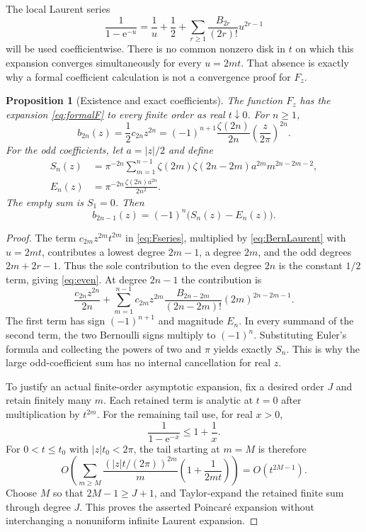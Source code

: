 \documentclass[11pt,a4paper]{article}
\numberwithin{equation}{section}
\newtheorem{proposition}[theorem]{Proposition}
\theoremstyle{definition}
\theoremstyle{remark}
\newcommand{\e}{\mathrm e}
\begin{document}
The local Laurent series
\begin{equation}
 \frac1{1-\e^{-u}}=\frac1u+\frac12+
       \sum_{r\ge1}\frac{B_{2r}}{(2r)!}u^{2r-1}
 \label{eq:BernLaurent}
\end{equation}
will be used coefficientwise. There is no common nonzero disk in $t$ on which this expansion converges simultaneously for every $u=2mt$. That absence is exactly why a formal coefficient calculation is not a convergence proof for $F_z$.

\begin{proposition}[Existence and exact coefficients]
\label{prop:coeff}
The function $F_z$ has the expansion \eqref{eq:formalF} to every finite order as real $t\downarrow0$. For $n\ge1$,
\begin{equation}
 b_{2n}(z)=\frac12c_{2n}z^{2n}
 =(-1)^{n+1}\frac{\zeta(2n)}{2n}
                 \left(\frac{z}{2\pi}\right)^{2n}.
 \label{eq:even}
\end{equation}
For the odd coefficients, let $a=|z|/2$ and define
\begin{align}
 S_n(z)&=\pi^{-2n}\sum_{m=1}^{n-1}
  \zeta(2m)\zeta(2n-2m)a^{2m}m^{2n-2m-2},\label{eq:S}\\
 E_n(z)&=\pi^{-2n}\frac{\zeta(2n)a^{2n}}{2n^2}.
 \label{eq:E}
\end{align}
The empty sum is $S_1=0$. Then
\begin{equation}
 b_{2n-1}(z)=(-1)^n\bigl(S_n(z)-E_n(z)\bigr).
 \label{eq:odd}
\end{equation}
\end{proposition}
\begin{proof}
The term $c_{2m}z^{2m}t^{2m}$ in \eqref{eq:Fseries}, multiplied by \eqref{eq:BernLaurent} with $u=2mt$, contributes a lowest degree $2m-1$, a degree $2m$, and the odd degrees $2m+2r-1$. Thus the sole contribution to the even degree $2n$ is the constant $1/2$ term, giving \eqref{eq:even}. At degree $2n-1$ the contribution is
\begin{equation}
 \frac{c_{2n}z^{2n}}{2n}
 +\sum_{m=1}^{n-1}c_{2m}z^{2m}
   \frac{B_{2n-2m}}{(2n-2m)!}(2m)^{2n-2m-1}.
 \label{eq:oddBern}
\end{equation}
The first term has sign $(-1)^{n+1}$ and magnitude $E_n$. In every summand of the second term, the two Bernoulli signs multiply to $(-1)^n$. Substituting Euler's formula and collecting the powers of two and $\pi$ yields exactly $S_n$. This is why the large odd-coefficient sum has no internal cancellation for real $z$.

To justify an actual finite-order asymptotic expansion, fix a desired order $J$ and retain finitely many $m$. Each retained term is analytic at $t=0$ after multiplication by $t^{2m}$. For the remaining tail use, for real $x>0$,
\[
 \frac1{1-\e^{-x}}\le1+\frac1x.
\]
For $0<t\le t_0$ with $|z|t_0<2\pi$, the tail starting at $m=M$ is therefore
\[
 O\!\left(\sum_{m\ge M}\frac{(|z|t/(2\pi))^{2m}}m
                         \left(1+\frac1{2mt}\right)\right)
 =O(t^{2M-1}).
\]
Choose $M$ so that $2M-1\ge J+1$, and Taylor-expand the retained finite sum through degree $J$. This proves the asserted Poincar\'e expansion without interchanging a nonuniform infinite Laurent expansion.
\end{proof}
\end{document}
